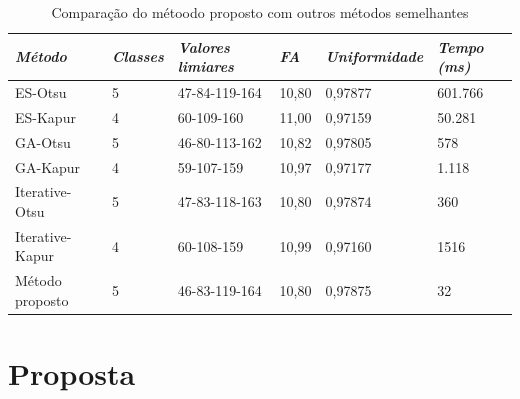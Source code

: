 \documentclass[12pt,oneside,a4paper,english,french,spanish,brazil,]{abntex2}
\begin{document}
\begin{table}[]
\centering
\caption{Comparação do métoodo proposto com outros métodos semelhantes}
\label{tab:TrCo_Bammouche_Resultados}
\begin{tabular}{llllll}
\hline
\textit{\textbf{\small{Método}}} & \textit{\textbf{\small{Classes}}} & \textit{\textbf{\small{Valores limiares}}} & \textit{\textbf{\small{FA}}} & \textit{\textbf{\small{Uniformidade}}} & \textit{\textbf{\small{Tempo (ms)}}} \\ \hline
ES-Otsu                  & 5                                   & 47-84-119-164                          & 10,80                           & 0,97877                        & 601.766                             \\
ES-Kapur                 & 4                                   & 60-109-160                             & 11,00                           & 0,97159                        & 50.281                              \\
GA-Otsu                  & 5                                   & 46-80-113-162                          & 10,82                           & 0,97805                        & 578                                 \\
GA-Kapur                 & 4                                   & 59-107-159                             & 10,97                           & 0,97177                        & 1.118                               \\
Iterative-Otsu           & 5                                   & 47-83-118-163                          & 10,80                           & 0,97874                        & 360                                 \\
Iterative-Kapur          & 4                                   & 60-108-159                             & 10,99                           & 0,97160                        & 1516                                \\
Método proposto          & 5                                   & 46-83-119-164                          & 10,80                           & 0,97875                        & 32                                  \\ \hline
\end{tabular}
\end{table}

\chapter{Proposta}
\label{chap:Proposta}
\end{document}
